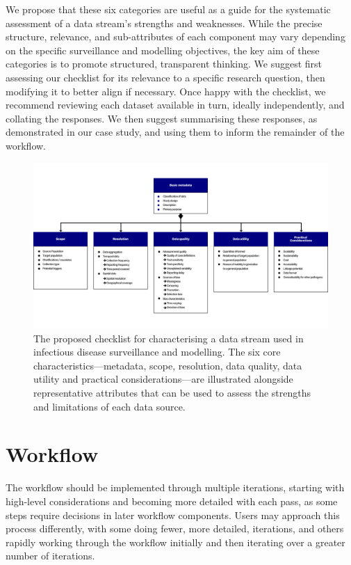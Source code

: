 \documentclass{article}
\begin{document}
We propose that these six categories are useful as a guide for the systematic assessment of a data stream's strengths and weaknesses. While the precise structure, relevance, and sub-attributes of each component may vary depending on the specific surveillance and modelling objectives, the key aim of these categories is to promote structured, transparent thinking. We suggest first assessing our checklist for its relevance to a specific research question, then modifying it to better align if necessary. Once happy with the checklist, we recommend reviewing each dataset available in turn, ideally independently, and collating the responses. We then suggest summarising these responses, as demonstrated in our case study, and using them to inform the remainder of the workflow.


\begin{figure}[H] 
\includegraphics[width=1\linewidth]{figures/Abbott et al figure 1.png}
\centering
\caption{The proposed checklist for characterising a data stream used in infectious disease surveillance and modelling. The six core characteristics---metadata, scope, resolution, data quality, data utility and practical considerations---are illustrated alongside representative attributes that can be used to assess the strengths and limitations of each data source. }
\label{data_characteristics}
\end{figure}


\section{Workflow}
\label{sec:workflow}

The workflow should be implemented through multiple iterations, starting with high-level considerations and becoming more detailed with each pass, as some steps require decisions in later workflow components. Users may approach this process differently, with some doing fewer, more detailed, iterations, and others rapidly working through the workflow initially and then iterating over a greater number of iterations.
\end{document}
